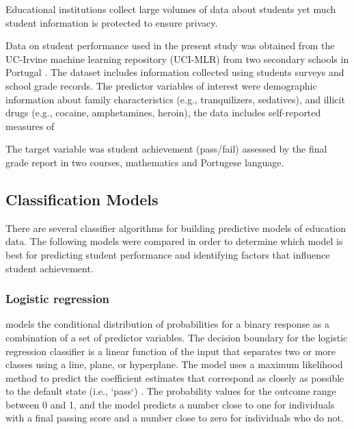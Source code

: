 \documentclass[sigconf]{acmart}
\begin{document}

Educational institutions collect large volumes of data about students yet 
much student information is protected to ensure privacy. 

Data on student performance used in the present study was obtained from the
UC-Irvine machine learning repository (UCI-MLR) from two secondary schools 
in Portugal \cite{cortez09}. The dataset includes information collected using
students surveys and school grade records. The predictor variables of interest
were demographic information about family characteristics (e.g., tranquilizers, sedatives), and illicit drugs (e.g., cocaine, 
amphetamines, heroin), the data includes self-reported measures of 

The target variable was student achievement (pass/fail) assessed by the 
final grade report in two courses, mathematics and Portugese language. 



\subsection{Classification Models}

There are several classifier algorithms for building predictive models of
education data. The following models were compared in order to determine
which model is best for predicting student performance and identifying
factors that influence student achievement. 

\subsubsection{Logistic regression} models the conditional distribution of 
probabilities for a binary response as a combination of a set of predictor 
variables. The decision boundary for the logistic regression classifier is a 
linear function of the input that separates two or more classes using a line, 
plane, or hyperplane. The model uses a maximum likelihood method to predict the 
coefficient estimates that correspond as closely as possible to the default 
state (i.e., `pass`) . The probability values for the outcome range between 
0 and 1, and the model predicts a number close to one for individuals with a 
final passing score and a number close to zero for individuals who do not. 

\end{document}
